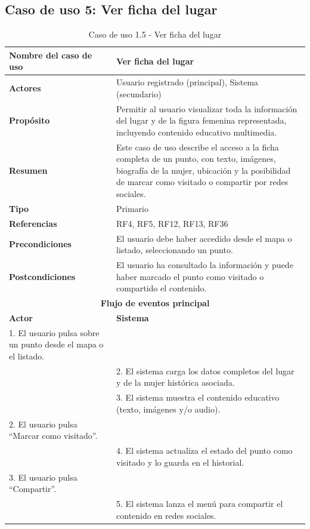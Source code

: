 \clearpage
\subsection{Caso de uso 5: Ver ficha del lugar}

\begin{table}[H]
\centering
\caption{Caso de uso 1.5 - Ver ficha del lugar}
\begin{tabular}{|p{4.5cm}|p{10.5cm}|}
\hline
\textbf{Nombre del caso de uso} & Ver ficha del lugar \\
\hline
\textbf{Actores} & Usuario registrado (principal), Sistema (secundario) \\
\hline
\textbf{Propósito} & Permitir al usuario visualizar toda la información del lugar y de la figura femenina representada, incluyendo contenido educativo multimedia. \\
\hline
\textbf{Resumen} & Este caso de uso describe el acceso a la ficha completa de un punto, con texto, imágenes, biografía de la mujer, ubicación y la posibilidad de marcar como visitado o compartir por redes sociales. \\
\hline
\textbf{Tipo} & Primario \\
\hline
\textbf{Referencias} & RF4, RF5, RF12, RF13, RF36 \\
\hline
\textbf{Precondiciones} & El usuario debe haber accedido desde el mapa o listado, seleccionando un punto. \\
\hline
\textbf{Postcondiciones} & El usuario ha consultado la información y puede haber marcado el punto como visitado o compartido el contenido. \\
\hline
\multicolumn{2}{|c|}{\textbf{Flujo de eventos principal}} \\
\hline
\textbf{Actor} & \textbf{Sistema} \\
\hline
1. El usuario pulsa sobre un punto desde el mapa o el listado. & \\
\hline
& 2. El sistema carga los datos completos del lugar y de la mujer histórica asociada. \\
\hline
& 3. El sistema muestra el contenido educativo (texto, imágenes y/o audio). \\
\hline
2. El usuario pulsa “Marcar como visitado”. & \\
\hline
& 4. El sistema actualiza el estado del punto como visitado y lo guarda en el historial. \\
\hline
3. El usuario pulsa “Compartir”. & \\
\hline
& 5. El sistema lanza el menú para compartir el contenido en redes sociales. \\
\hline
\end{tabular}
\end{table}

